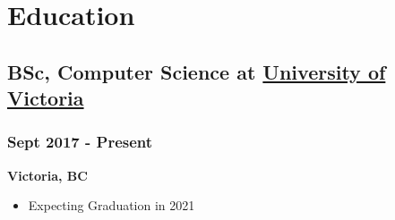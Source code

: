 \documentclass[letterpaper]{article}
\begin{document}
\section{Education}
\label{sec-4}
\subsection{BSc, Computer Science at \href{https://www.uvic.ca/}{University of Victoria}}
\label{sec-4-1}
\subsubsection{Sept 2017 - Present}
\label{sec-4-1-1}
\textbf{Victoria, BC}
\begin{itemize}
\item Expecting Graduation in 2021
\end{itemize}
\end{document}

